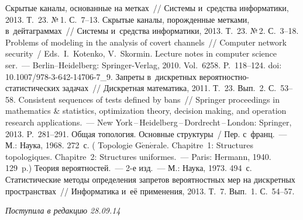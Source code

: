 \begin{multicols}{2}
\vspace*{-6pt}

{\small\frenchspacing
 {%
 \begin{thebibliography}{9}
     Скрытые каналы, основанные на метках~// Системы
и~средства информатики, 2013. Т.~23. №\,1. С.~7--13.
     Скрытые каналы, порожденные
метками, в~дейтаграммах~// Системы и~средства информатики, 2013. Т.~23.
№\,2. С.~3--18.
     Problems of modeling in the analysis
of covert channels~// Computer network security~/
Eds.\ I.~Kotenko, V.~Skormin. Lecture notes in computer
science ser.~--- Berlin--Heidelberg: Springer-Verlag, 2010. Vol.~6258. P.~118--124. doi: 10.1007/978-3-642-14706-7\_9.
     Запреты в~дискретных ве\-ро\-ят\-но\-ст\-но-ста\-ти\-сти\-че\-ских задачах~// Дискретная математика, 2011. Т.~23. Вып.~2.
    С.~53--58.
     Consistent sequences of tests defined
by bans~// Springer proceedings in mathematics \& statistics, optimization theory,
decision making, and operation research applications.~---
New York\,--\,Heidelberg\,--\,Dordrecht\,--\,London: Springer, 2013. \mbox{P.~281--291}.
     Общая топология. Основные структуры~/ Пер.
    с~франц.~--- М.: Наука, 1968. 272~с. ( Topologie
G$\acute{\mbox{e}}$n$\acute{\mbox{e}}$rale. Chapitre~1: Structures
topologiques. Chapitre~2: Structures uniformes.~--- Paris: Hermann, 1940. 129~p.)
     Теория вероятностей.~--- 2-е изд.~---
    М.: Наука, 1973. 494~с.
     Статистические методы
определения запретов вероятностных мер на дискретных пространствах~//
Информатика и~её применения, 2013. Т.~7. Вып.~1. С.~54--57.

 \end{thebibliography}

 }
 }

\end{multicols}

\vspace*{-12pt}

\hfill{\small\textit{Поступила в редакцию 28.09.14}}


\vspace*{10pt}

